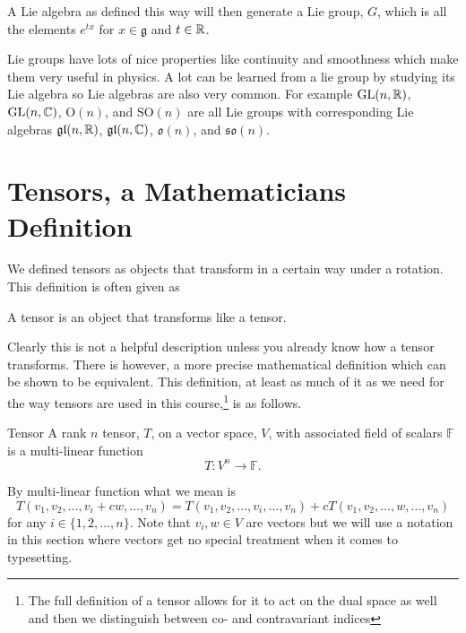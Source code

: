 \documentclass[a4paper]{article}
\newcommand{\generalLinearGroup}{\mathrm{GL}}
\newcommand{\orthogonalGroup}{\mathrm{O}}
\newcommand{\specialOrthogonalGroup}{\mathrm{SO}}
\newcommand{\lieAlgebra}[1]{\mathfrak{#1}}
\begin{document}
    A Lie algebra as defined this way will then generate a Lie group, \(G\), which is all the elements \(e^{tx}\) for \(x\in\lieAlgebra{g}\) and \(t\in\mathbb{R}\).
    
    Lie groups have lots of nice properties like continuity and smoothness which make them very useful in physics.
    A lot can be learned from a lie group by studying its Lie algebra so Lie algebras are also very common.
    For example \(\generalLinearGroup(n, \reals)\), \(\generalLinearGroup(n, \complex)\), \(\orthogonalGroup(n)\), and \(\specialOrthogonalGroup(n)\) are all Lie groups with corresponding Lie algebras \(\lieAlgebra{gl}(n, \reals)\), \(\lieAlgebra{gl}(n, \complex)\), \(\lieAlgebra{o}(n)\), and \(\lieAlgebra{so}(n)\).
    
    \section{Tensors, a Mathematicians Definition}\label{app:tensors}
    We defined tensors as objects that transform in a certain way under a rotation.
    This definition is often given as
    \begin{displayquote}
        A tensor is an object that transforms like a tensor.
    \end{displayquote}
    Clearly this is not a helpful description unless you already know how a tensor transforms.
    There is however, a more precise mathematical definition which can be shown to be equivalent.
    This definition, at least as much of it as we need for the way tensors are used in this course,\footnote{The full definition of a tensor allows for it to act on the dual space as well and then we distinguish between co- and contravariant indices} is as follows.
    \begin{definition}{Tensor}{}
        A rank \(n\) tensor, \(T\), on a vector space, \(V\), with associated field of scalars \(\mathbb{F}\) is a multi-linear function
        \[T\colon V^n \to \mathbb{F}.\]
    \end{definition}
    By multi-linear function what we mean is
    \[T(v_1, v_2, \dotsc, v_i + cw, \dotsc, v_n) = T(v_1, v_2, \dotsc, v_i, \dotsc, v_n) + cT(v_1, v_2, \dotsc, w, \dotsc, v_n)\]
    for any \(i\in\{1, 2, \dotsc, n\}\).
    Note that \(v_i, w\in V\) are vectors but we will use a notation in this section where vectors get no special treatment when it comes to typesetting.
    
\end{document}
